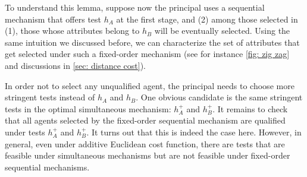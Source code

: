 
To understand this lemma, suppose now the principal uses a sequential mechanism that offers test $h_{A}$ at the first stage, and (2) among those
selected in (1), those whose attributes belong to $h_{B}$ will be eventually
selected. Using the same intuition we discussed before, we can characterize the set of attributes that get selected under such a fixed-order mechanism (see for instance \cref{fig: zig zag} and discussions in \cref{sec: distance cost}).

In order not to select any unqualified agent, the principal needs to choose
more stringent tests instead of $h_{A}$ and $h_{B}$. One obvious candidate is the same stringent tests  in the optimal simultaneous mechanism: $%
h_{A}^{+}$ and $h_{B}^{+}$.
It remains to check that all agents selected by the fixed-order sequential mechanism are qualified under tests $%
h_{A}^{+}$ and $h_{B}^{+}$.
It turns out that this is indeed the case here.
However, in general, even under additive Euclidean cost function, there are tests that are feasible under simultaneous mechanisms but are not feasible under fixed-order sequential mechanisms.

